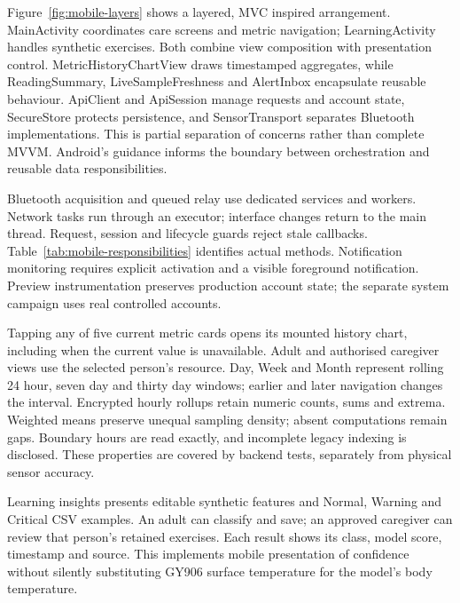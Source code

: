 \begin{reportprose}
Figure~\ref{fig:mobile-layers} shows a layered, MVC inspired arrangement. MainActivity coordinates care screens and metric navigation; LearningActivity handles synthetic exercises. Both combine view composition with presentation control. MetricHistoryChartView draws timestamped aggregates, while ReadingSummary, LiveSampleFreshness and AlertInbox encapsulate reusable behaviour. ApiClient and ApiSession manage requests and account state, SecureStore protects persistence, and SensorTransport separates Bluetooth implementations. This is partial separation of concerns rather than complete MVVM. Android's guidance informs the boundary between orchestration and reusable data responsibilities.\cite{androidarch}

Bluetooth acquisition and queued relay use dedicated services and workers. Network tasks run through an executor; interface changes return to the main thread. Request, session and lifecycle guards reject stale callbacks. Table~\ref{tab:mobile-responsibilities} identifies actual methods. Notification monitoring requires explicit activation and a visible foreground notification. Preview instrumentation preserves production account state; the separate system campaign uses real controlled accounts.

Tapping any of five current metric cards opens its mounted history chart, including when the current value is unavailable. Adult and authorised caregiver views use the selected person's resource. Day, Week and Month represent rolling 24 hour, seven day and thirty day windows; earlier and later navigation changes the interval. Encrypted hourly rollups retain numeric counts, sums and extrema. Weighted means preserve unequal sampling density; absent computations remain gaps. Boundary hours are read exactly, and incomplete legacy indexing is disclosed. These properties are covered by backend tests, separately from physical sensor accuracy.

Learning insights presents editable synthetic features and Normal, Warning and Critical CSV examples. An adult can classify and save; an approved caregiver can review that person's retained exercises. Each result shows its class, model score, timestamp and source. This implements mobile presentation of confidence without silently substituting GY906 surface temperature for the model's body temperature.
\end{reportprose}
\RoleScreensFigure
\MobileLayersDiagram
\MobileResponsibilitiesTable
\RoleTable

